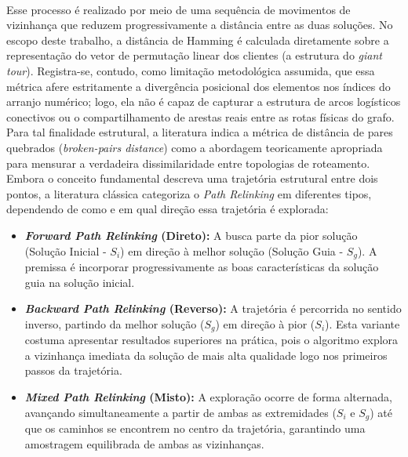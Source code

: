 \paragraph{} Esse processo é realizado por meio de uma sequência de movimentos de vizinhança que reduzem progressivamente a distância entre as duas soluções. No escopo deste trabalho, a distância de Hamming é calculada diretamente sobre a representação do vetor de permutação linear dos clientes (a estrutura do \textit{giant tour}). Registra-se, contudo, como limitação metodológica assumida, que essa métrica afere estritamente a divergência posicional dos elementos nos índices do arranjo numérico; logo, ela não é capaz de capturar a estrutura de arcos logísticos conectivos ou o compartilhamento de arestas reais entre as rotas físicas do grafo. Para tal finalidade estrutural, a literatura indica a métrica de distância de pares quebrados (\textit{broken-pairs distance}) como a abordagem teoricamente apropriada para mensurar a verdadeira dissimilaridade entre topologias de roteamento. Embora o conceito fundamental descreva uma trajetória estrutural entre dois pontos, a literatura clássica \cite{Glover00} categoriza o \textit{Path Relinking} em diferentes tipos, dependendo de como e em qual direção essa trajetória é explorada:

\begin{itemize}
    \item \textbf{\textit{Forward Path Relinking} (Direto):} A busca parte da pior solução (Solução Inicial - $S_i$) em direção à melhor solução (Solução Guia - $S_g$). A premissa é incorporar progressivamente as boas características da solução guia na solução inicial.
    
    \item \textbf{\textit{Backward Path Relinking} (Reverso):} A trajetória é percorrida no sentido inverso, partindo da melhor solução ($S_g$) em direção à pior ($S_i$). Esta variante costuma apresentar resultados superiores na prática, pois o algoritmo explora a vizinhança imediata da solução de mais alta qualidade logo nos primeiros passos da trajetória.
    
    \item \textbf{\textit{Mixed Path Relinking} (Misto):} A exploração ocorre de forma alternada, avançando simultaneamente a partir de ambas as extremidades ($S_i$ e $S_g$) até que os caminhos se encontrem no centro da trajetória, garantindo uma amostragem equilibrada de ambas as vizinhanças.
\end{itemize}

